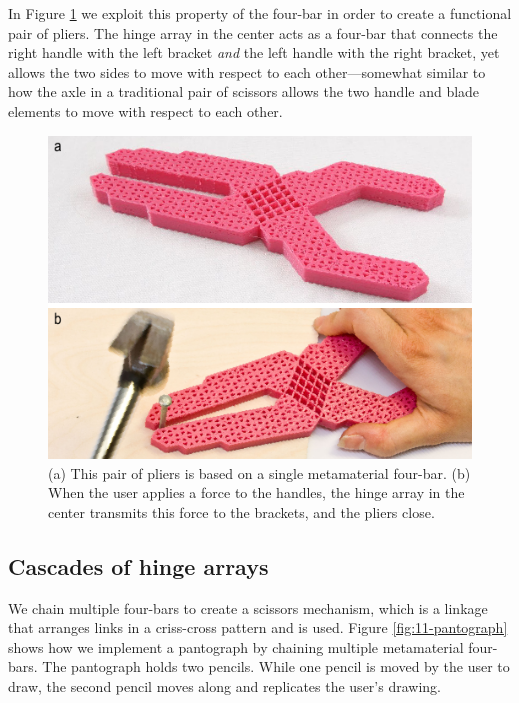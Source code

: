 In Figure \ref{fig:10-pliers-ninjaflex} we exploit this property of the four-bar in order to create a functional pair of pliers. The hinge array in the center acts as a four-bar that connects the right handle with the left bracket \textit{and} the left handle with the right bracket, yet allows the two sides to move with respect to each other---somewhat similar to how the axle in a traditional pair of scissors allows the two handle and blade elements to move with respect to each other.

\begin{figure} [h]
    \includegraphics[width=\textwidth]{chapters/metamaterial-mechanisms-FIG/10-pliers-ninjaflex.pdf}
    \caption[Short figure name.]{(a) This pair of pliers is based on a single metamaterial four-bar. (b) When the user applies a force to the handles, the hinge array in the center transmits this force to the brackets, and the pliers close. 
    \label{fig:10-pliers-ninjaflex}}
\end{figure}


\subsection{Cascades of hinge arrays}

We chain multiple four-bars to create a scissors mechanism, which is a linkage that arranges links in a criss-cross pattern and is used. Figure \ref{fig:11-pantograph} shows how we implement a pantograph by chaining multiple metamaterial four-bars. The pantograph holds two pencils. While one pencil is moved by the user to draw, the second pencil moves along and replicates the user’s drawing.
 
